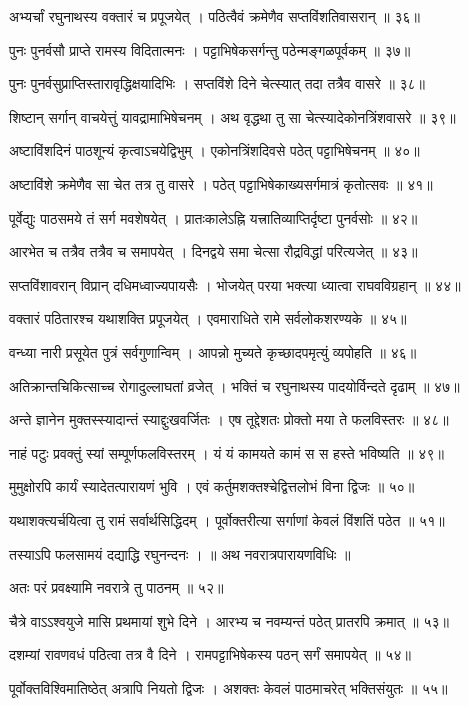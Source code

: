 अभ्यर्चां रघुनाथस्य वक्तारं च प्रपूजयेत् ।
पठित्वैवं क्रमेणैव सप्तविंशतिवासरान् ॥ ३६॥

पुनः पुनर्वसौ प्राप्ते रामस्य विदितात्मनः ।
पट्टाभिषेकसर्गन्तु पठेन्मङ्गळपूर्वकम् ॥ ३७॥

पुनः पुनर्वसुप्राप्तिस्तारावृद्धिक्षयादिभिः ।
सप्तविंशे दिने चेत्स्यात् तदा तत्रैव वासरे ॥ ३८॥

शिष्टान् सर्गान् वाचयेत्तुं यावद्रामाभिषेचनम् ।
अथ वृद्धथा तु सा चेत्स्यादेकोनत्रिंशवासरे ॥ ३९॥

अष्टाविंशदिनं पाठशून्यं कृत्वाऽचयेद्विभुम् ।
एकोनत्रिंशदिवसे पठेत् पट्टाभिषेचनम् ॥ ४०॥

अष्टाविंशे क्रमेणैव सा चेत तत्र तु वासरे ।
पठेत् पट्टाभिषेकाख्यसर्गमात्रं कृतोत्सवः ॥ ४१॥

पूर्वेद्युः पाठसमये तं सर्ग मवशेषयेत् ।
प्रातःकालेऽह्नि यत्त्रातिव्याप्तिर्दृष्टा पुनर्वसोः ॥ ४२॥

आरभेत च तत्रैव तत्रैव च समापयेत् ।
दिनद्वये समा चेत्सा रौद्रविद्धां परित्यजेत् ॥ ४३॥

सप्तविंशावरान् विप्रान् दधिमध्वाज्यपायसैः ।
भोजयेत् परया भक्त्या ध्यात्वा राघवविग्रहान् ॥ ४४॥

वक्तारं पठितारश्च यथाशक्ति प्रपूजयेत् ।
एवमाराधिते रामे सर्वलोकशरण्यके ॥ ४५॥

वन्ध्या नारी प्रसूयेत पुत्रं सर्वगुणान्विम् ।
आपन्नो मुच्यते कृच्छादपमृत्युं व्यपोहति ॥ ४६॥

अतिक्रान्तचिकित्साच्च रोगादुल्लाघतां व्रजेत् ।
भक्तिं च रघुनाथस्य पादयोर्विन्दते दृढाम् ॥ ४७॥

अन्ते ज्ञानेन मुक्तस्स्यादान्तं स्याद्दुःखवर्जितः ।
एष तूद्देशतः प्रोक्तो मया ते फलविस्तरः ॥ ४८॥

नाहं पटुः प्रवक्तुं स्यां सम्पूर्णफलविस्तरम् ।
यं यं कामयते कामं स स हस्ते भविष्यति ॥ ४९॥

मुमुक्षोरपि कार्यं स्यादेतत्पारायणं भुवि ।
एवं कर्तुमशक्तश्चेद्वित्तलोभं विना द्विजः ॥ ५०॥

यथाशक्त्यर्चयित्वा तु रामं सर्वार्थसिद्धिदम् ।
पूर्वोक्तरीत्या सर्गाणां केवलं विंशतिं पठेत ॥ ५१॥

तस्याऽपि फलसामयं दद्याद्धि रघुनन्दनः ।
॥ अथ नवरात्रपारायणविधिः ॥

अतः परं प्रवक्ष्यामि नवरात्रे तु पाठनम् ॥ ५२॥

चैत्रे वाऽऽश्वयुजे मासि प्रथमायां शुभे दिने ।
आरभ्य च नवम्यन्तं पठेत् प्रातरपि क्रमात् ॥ ५३॥

दशम्यां रावणवधं पठित्वा तत्र वै दिने ।
रामपट्टाभिषेकस्य पठन् सर्गं समापयेत् ॥ ५४॥

पूर्वोक्तविश्विमातिष्ठेत् अत्रापि नियतो द्विजः ।
अशक्तः केवलं पाठमाचरेत् भक्तिसंयुतः ॥ ५५॥

